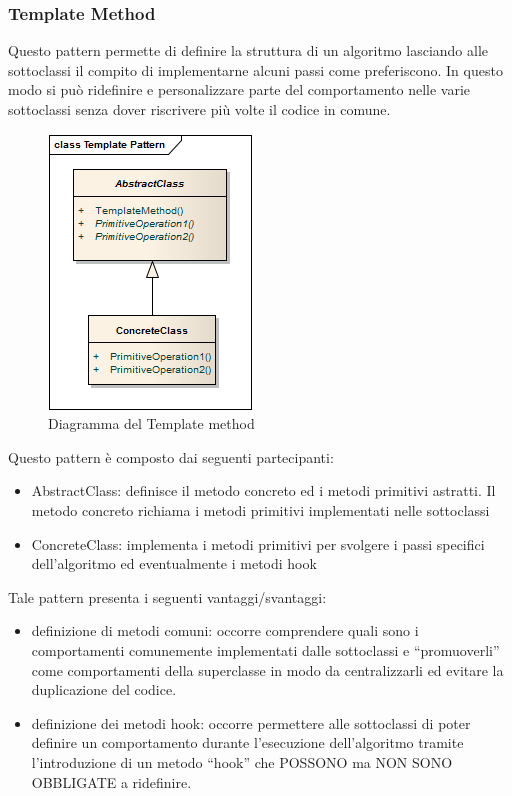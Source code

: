 \subsubsection{Template Method}
Questo pattern permette di definire la struttura di un algoritmo
lasciando alle sottoclassi il compito di implementarne alcuni passi
come preferiscono. In questo modo si può ridefinire e personalizzare
parte del comportamento nelle varie sottoclassi senza dover riscrivere
più volte il codice in comune. 

	\FloatBarrier
	\begin{figure}[ht]
		\centering
		\includegraphics[scale=0.45]{img/template-pattern.png}
		\caption{Diagramma del Template method}
	\end{figure}


Questo pattern è composto dai seguenti partecipanti:
\begin{itemize}
	\item AbstractClass: definisce il metodo concreto ed i metodi primitivi astratti. Il metodo concreto richiama i metodi primitivi implementati nelle sottoclassi
	\item ConcreteClass: implementa i metodi primitivi per svolgere i passi specifici dell’algoritmo ed eventualmente i metodi hook
\end{itemize}

Tale pattern presenta i seguenti vantaggi/svantaggi:
\begin{itemize}
	\item definizione di metodi comuni: occorre comprendere quali sono
     i comportamenti comunemente implementati dalle sottoclassi e
     “promuoverli” come comportamenti della superclasse in modo da
     centralizzarli ed evitare la duplicazione del codice. 
	\item definizione dei metodi hook: occorre permettere alle
     sottoclassi di poter definire un comportamento durante
     l’esecuzione dell’algoritmo tramite l’introduzione di un metodo
     “hook” che POSSONO ma NON SONO OBBLIGATE a ridefinire. 
\end{itemize}

